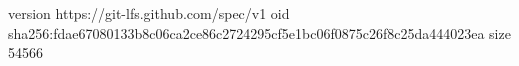 version https://git-lfs.github.com/spec/v1
oid sha256:fdae67080133b8c06ca2ce86c2724295cf5e1bc06f0875c26f8c25da444023ea
size 54566
